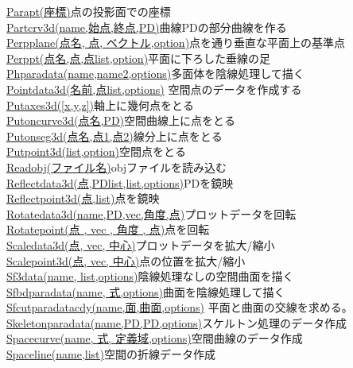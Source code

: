 \documentclass[papersize,a4paper,12pt,uplatex]{jsarticle}
\begin{document}
\begin{tabbing}
\hyperlink{parapt}{Parapt(座標)}\>点の投影面での座標\\
\hyperlink{partcrv3d}{Partcrv3d(name,始点,終点,PD)}\>曲線PDの部分曲線を作る\\
\hyperlink{perpplane}{Perpplane(点名, 点, ベクトル,option)}\>点を通り垂直な平面上の基準点\\
\hyperlink{perppt}{Perppt(点名,点,点list,option)}\>平面に下ろした垂線の足\\
\hyperlink{phparadata}{Phparadata(name,name2,options)}\>多面体を陰線処理して描く\\
\hyperlink{pointdata3d}{Pointdata3d(名前,点list,options)} \>空間点のデータを作成する\\
\hyperlink{putaxes3d}{Putaxes3d([x,y,z])}\>軸上に幾何点をとる\\
\hyperlink{putonCurve3d}{Putoncurve3d(点名,PD)}\>空間曲線上に点をとる\\
\hyperlink{putonseg3d}{Putonseg3d(点名,点1,点2)}\>線分上に点をとる\\
\hyperlink{putpoint3d}{Putpoint3d(list,option)}\>空間点をとる\\
\hyperlink{readobj}{Readobj(ファイル名)}\>objファイルを読み込む\\
\hyperlink{reflectdata3d}{Reflectdata3d(点,PDlist,list,options)}\>PDを鏡映\\
\hyperlink{reflectpoint3d}{Reflectpoint3d(点,list)}\>点を鏡映\\
\hyperlink{rotatedata3d}{Rotatedata3d(name,PD,vec,角度,点)}\>プロットデータを回転\\
\hyperlink{rotatepoint3d}{Rotatepoint(点 , vec , 角度 , 点)}\>点を回転\\
\hyperlink{scaledata3d}{Scaledata3d(点, vec, 中心)}\>プロットデータを拡大/縮小\\
\hyperlink{scalepoint3d}{Scalepoint3d(点, vec, 中心)}\>点の位置を拡大/縮小\\
\hyperlink{sf3data}{Sf3data(name, list,options)}\>陰線処理なしの空間曲面を描く\\
\hyperlink{sfbdparadata}{Sfbdparadata(name, 式,options)}\>曲面を陰線処理して描く\\
\hyperlink{sfcutparadatacdy}{Sfcutparadatacdy(name,面,曲面,options)} \>平面と曲面の交線を求める。\\
\hyperlink{skeletonparadata}{Skeletonparadata(name,PD,PD,options)}\>スケルトン処理のデータ作成\\
\hyperlink{spacecurve}{Spacecurve(name, 式, 定義域,options)}\>空間曲線のデータ作成\\
\hyperlink{spaceline}{Spaceline(name,list)}\>空間の折線データ作成\\

\end{tabbing}
\end{document}

